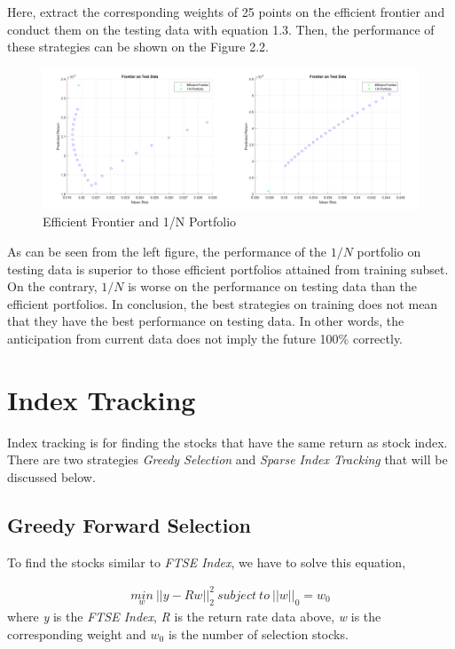 \documentclass[paper=a4, fontsize=11pt]{article} %
\numberwithin{equation}{section} %
\numberwithin{figure}{section} %
\numberwithin{table}{section} %
\begin{document}
Here, extract the corresponding weights of 25 points on the efficient frontier and conduct them on the testing data with equation 1.3. Then, the performance of these strategies can be shown on the Figure 2.2. 

\begin{figure}[h!]
	\centering
	\includegraphics[width=18cm]{fig3_2.png}
	\caption{Efficient Frontier and 1/N Portfolio}
\end{figure}

As can be seen from the left figure, the performance of the $1/N$ portfolio on testing data is superior to those efficient portfolios attained from training subset. On the contrary, $1/N$ is worse on the performance on testing data than the efficient portfolios. In conclusion, the best strategies on training does not mean that they have the best performance on testing data. In other words, the anticipation from current data does not imply the future 100\% correctly. 

\section{Index Tracking}

Index tracking is for finding the stocks that have the same return as stock index. There are two strategies \textit{Greedy Selection} and \textit{Sparse Index Tracking} that will be discussed below.

\subsection{Greedy Forward Selection}

To find the stocks similar to \textit{FTSE Index}, we have to solve this equation,

\begin{align}
\underset{w}{min} \ ||y-Rw||_{2}^{2} \ subject\ to\ ||w||_{0} = w_{0}
\end{align}
where \textit{y} is the \textit{FTSE Index}, \textit{R} is the return rate data above, \textit{w} is the corresponding weight and $w_0$ is the number of selection stocks. 
\end{document}
